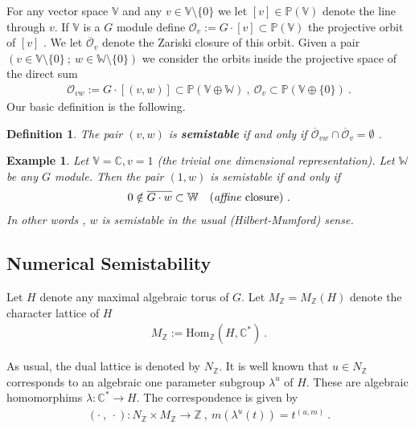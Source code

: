 \documentclass[12pt]{amsart}
\newtheorem{definition}{Definition}
\newtheorem{example}{Example}
\numberwithin{equation}{section}
\numberwithin{remark}{section}
\numberwithin{theorem}{section}
\numberwithin{proposition}{section}
\numberwithin{definition}{section}
\numberwithin{lemma}{section}
\numberwithin{claim}{section}
\numberwithin{corollary}{section}
\numberwithin{conjecture}{section}
\begin{document}
For any vector space $\mathbb{V}$ and any $v\in \mathbb{V}\setminus\{0\}$ we  let $[v]\in\mathbb{P}(\mathbb{V})$ denote the line through $v$. If $\mathbb{V}$ is a $G$ module define $\mathcal{O}_{v}:=G\cdot [v]\subset \mathbb{P}(\mathbb{V})$ the projective orbit of $[v]$ .  We let $\overline{\mathcal{O}}_{v}$ denote the Zariski closure of this orbit. Given a pair  $(v\in\mathbb{V}\setminus\{0\} \ ; \ w\in \mathbb{W}\setminus\{0\} )$ we consider the orbits inside the projective space of the direct sum  
\begin{align}
\mathcal{O}_{vw}:=G\cdot [(v,w)]  \subset \mathbb{P}(\mathbb{V}\oplus\mathbb{W}) \ , \ \mathcal{O}_{v} \subset \mathbb{P}(\mathbb{V}\oplus\{0\})\ .
\end{align}
  Our basic definition is the following.
  \begin{definition}\label{pair}
\emph{The pair $(v,w)$ is \textbf{\emph{semistable}} if and only if}  $ \overline{\mathcal{O}}_{vw}\cap\overline{\mathcal{O}}_{v}=\emptyset $ .
  \end{definition} 
\begin{example}\label{hmss} \emph{Let $\mathbb{V}=\mathbb{C}, v=1$ (the trivial one dimensional representation). Let $\mathbb{W}$ be any $G$ module.
Then  the pair $(1,w)$ is semistable if and only if
\begin{align}
0\notin \overline{G\cdot w}\subset \mathbb{W} \quad (\mbox{\emph{affine} closure} ) \ .
\end{align}
 In other words ,  $w$ is semistable in the usual (Hilbert-Mumford) sense.}
\end{example}

\subsection{Numerical Semistability}
Let $H$ denote any maximal algebraic torus of $G$.  Let $M_{\mathbb{Z}}=M_{\mathbb{Z}}(H)$ denote the {character lattice} of $H$
\begin{align}
M_{\mathbb{Z}}:= \mbox{Hom}_{\mathbb{Z}}(H,\mathbb{C}^*) \ . 
\end{align}

As usual, the dual lattice is denoted by $N_{\mathbb{Z}}$. It is well known that $ u\in N_{\mathbb{Z}}$ corresponds to an algebraic one parameter subgroup $\lambda^u$ of $H$. These are algebraic homomorphims $\lambda:\mathbb{C}^*{\ensuremath{\longrightarrow}} H$.  The correspondence is given by 
\begin{align}
(\cdot \ , \ \cdot) :N_{\mathbb{Z}}\times M_{\mathbb{Z}}{\ensuremath{\longrightarrow}} \mathbb{Z} \ , \ m(\lambda^u(t))=t^{(u , m)} \ .
\end{align}
 
\end{document}
